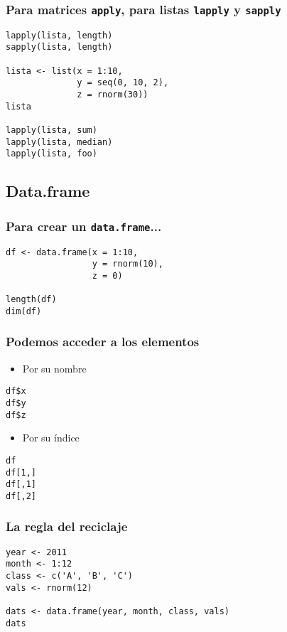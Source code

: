 \documentclass[xcolor={usenames,svgnames,dvipsnames}]{beamer}
\begin{document}
\begin{frame}[fragile]
\frametitle{Para matrices \texttt{apply}, para listas \texttt{lapply} y \texttt{sapply}}
\label{sec-4-1-4}


\lstset{language=R}
\begin{lstlisting}
lapply(lista, length)
sapply(lista, length)

lista <- list(x = 1:10,
              y = seq(0, 10, 2),
              z = rnorm(30))
lista

lapply(lista, sum)
lapply(lista, median)
lapply(lista, foo)
\end{lstlisting}
\end{frame}
\subsection{Data.frame}
\label{sec-4-2}
\begin{frame}[fragile]
\frametitle{Para crear un \texttt{data.frame}...}
\label{sec-4-2-1}


\lstset{language=R}
\begin{lstlisting}
df <- data.frame(x = 1:10,
                 y = rnorm(10),
                 z = 0)

length(df)
dim(df)
\end{lstlisting}
\end{frame}
\begin{frame}[fragile]
\frametitle{Podemos acceder a los elementos}
\label{sec-4-2-2}

\begin{itemize}
\item Por su nombre
\end{itemize}

\lstset{language=R}
\begin{lstlisting}
df$x
df$y
df$z
\end{lstlisting}

\begin{itemize}
\item Por su índice
\end{itemize}

\lstset{language=R}
\begin{lstlisting}
df
df[1,]
df[,1]
df[,2]
\end{lstlisting}
\end{frame}
\begin{frame}[fragile]
\frametitle{La regla del reciclaje}
\label{sec-4-2-3}


\lstset{language=R}
\begin{lstlisting}
year <- 2011
month <- 1:12
class <- c('A', 'B', 'C')
vals <- rnorm(12)

dats <- data.frame(year, month, class, vals)
dats
\end{lstlisting}
\end{frame}
\end{document}
